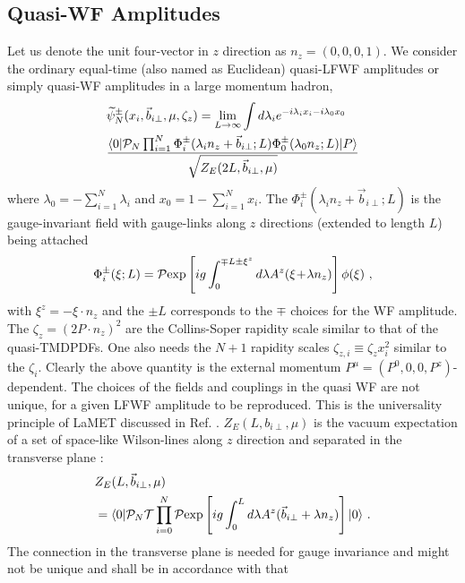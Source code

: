 \documentclass[twocolumn,superscriptaddress,longbibliography,10pt]{revtex4-1}
\begin{document}
\subsection{Quasi-WF Amplitudes}

Let us denote the unit four-vector in $z$ direction as $n_z=(0,0,0,1)$. We consider the ordinary equal-time (also named as Euclidean) quasi-LFWF amplitudes or simply quasi-WF amplitudes in a large momentum hadron,
\begin{align}\label{eq:quasi_WF}
&\widetilde \psi^{\pm}_N(x_i,\vec{b}_{i\perp},\mu,\zeta_{z})=\lim_{L\rightarrow \infty}\int d\lambda_i e^{-i\lambda_ix_{i}-i\lambda_0x_0} \\ &\frac{ \langle 0| {\cal P}_N\prod^N_{i=1}\Phi^{\pm}_i(\lambda_{i}{n_z}+\vec{b}_{i\perp};L)\Phi^{\pm}_0(\lambda_0 {n_z};L) |P\rangle}{\sqrt{Z_E(2L,\vec{b}_{i\perp},\mu)}} \nonumber
\end{align}
where $\lambda_0=-\sum_{i=1}^{N}\lambda_i$ and  $x_0=1-\sum_{i=1}^{N}x_i$.  The $\Phi^{\pm}_i(\lambda_{i}{n_z}+\vec{b}_{i\perp};L)$ is the gauge-invariant field with gauge-links along $z$ directions (extended to length $L$) being attached
\begin{align} \label{eq:invariantnz}
\Phi^{\pm}_i(\xi;L)={\cal P}{\rm exp}\left[ig\int_{0}^{\mp L\pm \xi^z} d\lambda A^z(\xi\!+\!\lambda {n_z})\right]\phi(\xi) \ ,
\end{align}
with $\xi^z=-\xi\cdot n_z$ and the $\pm L$ corresponds to the $\mp$ choices for the WF amplitude.
The $\zeta_{z}=(2P\cdot {n_z})^2$ are the Collins-Soper rapidity scale similar to that of the quasi-TMDPDFs. One also needs the $N+1$ rapidity scales $\zeta_{z,i}\equiv \zeta_zx_i^2$ similar to the $\zeta_i$.
Clearly the above quantity is the external momentum $P^\mu=(P^0, 0, 0, P^z)$-dependent. The choices of the fields and couplings in the quasi WF are not unique, for a given LFWF amplitude to be reproduced. This is the universality principle
of LaMET discussed in Ref. \cite{Ji:2020ect}. $Z_E(L,b_{i\perp},\mu)$ is the vacuum expectation of a set of space-like Wilson-lines
along $z$ direction and separated in the transverse plane :
\begin{align}\label{eq:ZE}
&Z_E(L,\vec{b}_{i\perp},\mu) \\
&=\langle 0|{\cal P}_N{\cal T}\prod_{i=0}^{N}{\cal P}{\rm exp}\left[ig\int_{0}^{L} d\lambda A^z(\vec{b}_{i\perp}+ \lambda{n_z})\right]|0\rangle \ . \nonumber
\end{align}
The connection in the transverse plane is needed for gauge invariance and might not be unique and shall be in accordance with that
\end{document}
